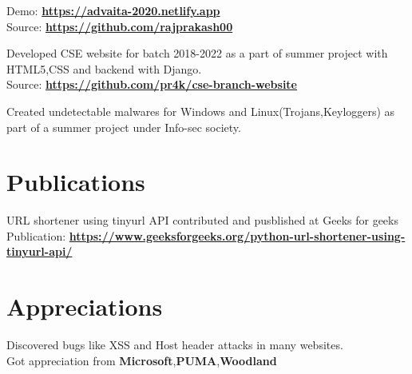 \documentclass[]{deedy-resume-openfont}
\begin{document}
\begin{minipage}[t]{0.63\textwidth}
Demo: \textbf{\href{https://advaita-2020.netlify.app}{https://advaita-2020.netlify.app}}\\
Source: \textbf{\href{https://github.com/rajprakash00}{https://github.com/rajprakash00}}

\sectionsep

Developed CSE website for batch 2018-2022 as a part of summer project with HTML5,CSS and backend with Django. \\
Source: \textbf{\href{https://github.com/pr4k/cse-branch-website}{https://github.com/pr4k/cse-branch-website}}
\sectionsep

Created undetectable malwares for Windows and
Linux(Trojans,Keyloggers) as part of a summer project under Info-sec society.
\sectionsep


\section{Publications} 
URL shortener using tinyurl API contributed and pusblished at Geeks for geeks\\
Publication: \textbf{\href{https://www.geeksforgeeks.org/python-url-shortener-using-tinyurl-api/}{https://www.geeksforgeeks.org/python-url-shortener-using-tinyurl-api/}}


\section{Appreciations}
Discovered bugs like XSS and Host header attacks in many websites.\\
Got appreciation from \textbf{Microsoft},\textbf{PUMA},\textbf{Woodland}

\end{minipage} 
\end{document}
